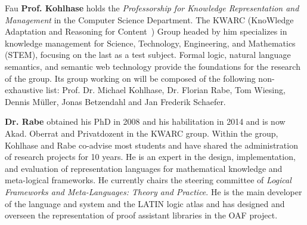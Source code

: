 \begin{sitedescription}{Fau}
\textbf{Prof. Kohlhase} holds the \emph{Professorship for Knowledge Representation and Management} in the Computer Science Department.
The KWARC (KnoWledge Adaptation and Reasoning for Content~\cite{KWARC:online}) Group headed by him specializes in knowledge management for Science, Technology, Engineering, and Mathematics (STEM), focusing on the last as a test subject.
Formal logic, natural language semantics, and semantic web technology provide the foundations for the research of the group.
Its group working on \pn will be composed of the following non-exhaustive list: Prof. Dr. Michael Kohlhase, Dr. Florian Rabe, Tom Wiesing, Dennis M\"uller, Jonas Betzendahl and Jan Frederik Schaefer.

\textbf{Dr. Rabe} obtained his PhD in 2008 and his habilitation in 2014 and is now Akad. Oberrat and Privatdozent in the KWARC group.
Within the group, Kohlhase and Rabe co-advise most students and have shared the administration of research projects for 10 years.
He is an expert in the design, implementation, and evaluation of representation languages for mathematical knowledge and meta-logical frameworks.
He currently chairs the steering committee of \emph{Logical Frameworks and Meta-Languages: Theory and Practice}.
He is the main developer of the \mmt language and system and the LATIN logic atlas and has designed and overseen the representation of proof assistant libraries in the OAF project.
\end{sitedescription}


